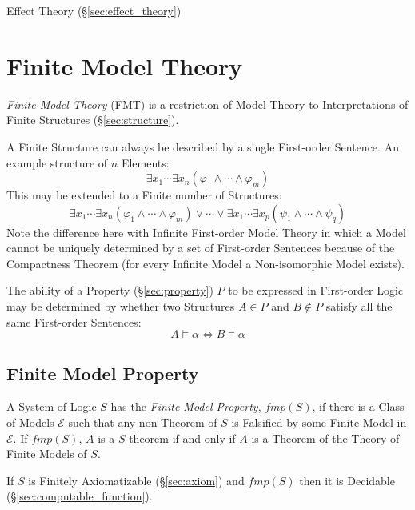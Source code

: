 Effect Theory (\S\ref{sec:effect_theory})



\section{Finite Model Theory}\label{sec:finite_model}

\emph{Finite Model Theory} (FMT) is a restriction of Model Theory to
Interpretations of Finite Structures (\S\ref{sec:structure}).

A Finite Structure can always be described by a single First-order
Sentence. An example structure of $n$ Elements:
\[
  \exists x_1 \cdots \exists x_n ( \varphi_1 \wedge \cdots \wedge
  \varphi_m )
\]
This may be extended to a Finite number of Structures:
\[
  \exists x_1 \cdots \exists x_n ( \varphi_1 \wedge \cdots \wedge
  \varphi_m )
  \vee
  \cdots
  \vee
  \exists x_1 \cdots \exists x_p ( \psi_1 \wedge \cdots \wedge
  \psi_q )
\]
Note the difference here with Infinite First-order Model Theory in
which a Model cannot be uniquely determined by a set of First-order
Sentences because of the Compactness Theorem (for every Infinite Model
a Non-isomorphic Model exists).

The ability of a Property (\S\ref{sec:property}) $P$ to be expressed
in First-order Logic may be determined by whether two Structures $A
\in P$ and $B \notin P$ satisfy all the same First-order Sentences:
\[
  A \models \alpha \Leftrightarrow B \models \alpha
\]



\subsection{Finite Model Property}\label{sec:finite_model_property}

A System of Logic $S$ has the \emph{Finite Model Property}, $fmp(S)$,
if there is a Class of Models $\mathcal{E}$ such that any non-Theorem
of $S$ is Falsified by some Finite Model in $\mathcal{E}$. If
$fmp(S)$, $A$ is a $S$-theorem if and only if $A$ is a Theorem of the
Theory of Finite Models of $S$.

If $S$ is Finitely Axiomatizable (\S\ref{sec:axiom}) and $fmp(S)$ then
it is Decidable (\S\ref{sec:computable_function}).



